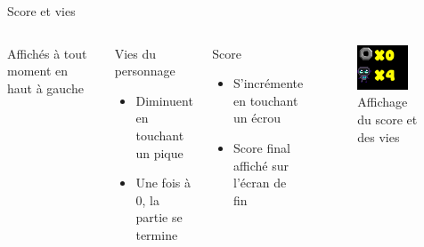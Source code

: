 \documentclass{beamer}
\begin{document}
{\begin{frame}{Score et vies}
    \begin{columns}
            Affichés à tout moment en haut à gauche
            \begin{block}{Vies du personnage}
                \begin{itemize}
                    \item[\bullet] Diminuent en touchant un pique
                    \item[\bullet] Une fois à 0, la partie se termine
                \end{itemize}
            \end{block}
            \begin{block}{Score}
                \begin{itemize}
                    \item[\bullet] S'incrémente en touchant un écrou
                    \item[\bullet] Score final affiché sur l'écran de fin
                \end{itemize}
            \end{block}
            \begin{figure}
                \centering
                \includegraphics[width=0.8\textwidth]{Screenshot from 2025-03-23 23-14-37.png}
                \caption{Affichage du score et des vies}
            \end{figure}
    \end{columns}
\end{frame}

}
\end{document}
